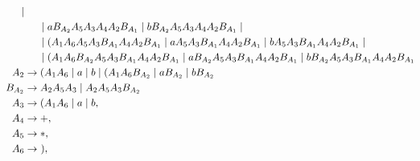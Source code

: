\documentclass[12pt]{article}
\begin{document}
\begin{ejercicio}[2.5 puntos]
\begin{description}
\begin{align*}
                \mid \\ & \hspace{0.5cm} \mid  a B_{A_2}A_5A_3A_4 A_2 B_{A_1} \mid b B_{A_2}A_5A_3A_4 A_2 B_{A_1}
                \mid \\ & \hspace{0.5cm} \mid (A_1 A_6 A_5 A_3 B_{A_1}A_4 A_2 B_{A_1} \mid aA_5 A_3 B_{A_1}A_4 A_2 B_{A_1} \mid bA_5 A_3 B_{A_1}A_4 A_2 B_{A_1}
                \mid \\ & \hspace{0.5cm}  \mid (A_1 A_6 B_{A_2}A_5 A_3 B_{A_1}A_4 A_2 B_{A_1} \mid  a B_{A_2}A_5 A_3 B_{A_1}A_4 A_2 B_{A_1} \mid b B_{A_2}A_5 A_3 B_{A_1}A_4 A_2 B_{A_1} \\
            \hspace{-2.5cm}A_2 &\to (A_1 A_6 \mid a \mid b \mid (A_1 A_6 B_{A_2} \mid  a B_{A_2} \mid  b B_{A_2} \\
            \hspace{-2.5cm}B_{A_2} & \to A_2 A_5 A_3 \mid A_2 A_5 A_3 B_{A_2}\\
            \hspace{-2.5cm}A_3 &\to (A_1 A_6 \mid a \mid b,\\
            \hspace{-2.5cm}A_4 &\to +,\\
            \hspace{-2.5cm}A_5 &\to *,\\
            \hspace{-2.5cm}A_6 &\to~),
        \end{align*}


\end{description}
\end{ejercicio}
\end{document}
